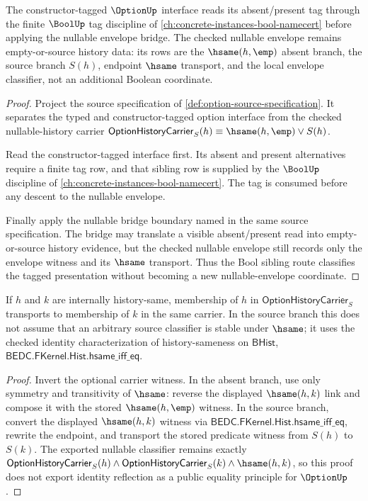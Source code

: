 \begin{theorem}
\label{thm:option-bool-tag-sibling-route}
The constructor-tagged $\OptionUp$ interface reads its absent/present tag through the finite $\BoolUp$ tag discipline of \autoref{ch:concrete-instances-bool-namecert} before applying the nullable envelope bridge. The checked nullable envelope remains empty-or-source history data: its rows are the $\hsame(h,\emp)$ absent branch, the source branch $S(h)$, endpoint $\hsame$ transport, and the local envelope classifier, not an additional Boolean coordinate.
\end{theorem}
\begin{proof}
Project the source specification of \autoref{def:option-source-specification}. It separates the typed and constructor-tagged option interface from the checked nullable-history carrier $\mathsf{OptionHistoryCarrier}_S(h)\equiv\hsame(h,\emp)\lor S(h)$.

Read the constructor-tagged interface first. Its absent and present alternatives require a finite tag row, and that sibling row is supplied by the $\BoolUp$ discipline of \autoref{ch:concrete-instances-bool-namecert}. The tag is consumed before any descent to the nullable envelope.

Finally apply the nullable bridge boundary named in the same source specification. The bridge may translate a visible absent/present read into empty-or-source history evidence, but the checked nullable envelope still records only the envelope witness and its $\hsame$ transport. Thus the Bool sibling route classifies the tagged presentation without becoming a new nullable-envelope coordinate.
\end{proof}

\begin{theorem}
\label{thm:option-history-carrier-hsame-transport}
If $h$ and $k$ are internally history-same, membership of $h$ in
$\mathsf{OptionHistoryCarrier}_S$ transports to membership of $k$ in the same
carrier. In the source branch this does not assume that an arbitrary source classifier is stable under $\hsame$; it uses the checked identity characterization of history-sameness on $\mathsf{BHist}$,
$\mathsf{BEDC.FKernel.Hist.hsame\_iff\_eq}$.
\end{theorem}
\begin{proof}
Invert the optional carrier witness. In the absent branch, use only symmetry and
transitivity of $\hsame$: reverse the displayed $\hsame(h,k)$ link and compose
it with the stored $\hsame(h,\emp)$ witness. In the source branch, convert the displayed $\hsame(h,k)$ witness via
$\mathsf{BEDC.FKernel.Hist.hsame\_iff\_eq}$, rewrite the endpoint, and transport the stored predicate witness from $S(h)$ to $S(k)$. The exported nullable classifier remains exactly
$\mathsf{OptionHistoryCarrier}_S(h)\land\mathsf{OptionHistoryCarrier}_S(k)\land\hsame(h,k)$,
so this proof does not export identity reflection as a public equality principle for $\OptionUp$.
\end{proof}

